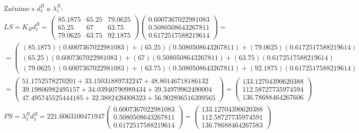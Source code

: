 \documentclass[a4paper]{article}
\begin{document}
	\begin{align*}
		&\text{Začnime s $d_1^B$ a $\lambda_1^B$:}
		\\
		&LS=K_B d_1^B= \begin{pmatrix}
			85.1875 & 65.25 & 79.0625 \\
			65.25 & 67 & 63.75 \\
			79.0625 & 63.75 & 92.1875
		\end{pmatrix}
		\begin{pmatrix}
			0.6007367022981083 \\ 
			0.5080508643267811 \\ 
			0.6172517588219614
		\end{pmatrix}=
		\\
		&=\begin{pmatrix}
			(85.1875)(0.6007367022981083) + (65.25)(0.5080508643267811) + (79.0625)(0.6172517588219614) \\
			(65.25)(0.6007367022981083) + (67)(0.5080508643267811) + (63.75)(0.6172517588219614) \\
			(79.0625)(0.6007367022981083) + (63.75)(0.5080508643267811) + (92.1875)(0.6172517588219614)
		\end{pmatrix}=
		\\
		&=\begin{pmatrix}
			51.1752578270201 + 33.15031889732247 + 48.80146718186132 \\
			39.19806982495157 + 34.03940790989434 + 39.34979962490004 \\
			47.495745525444185 + 32.3882426008323 + 56.902896516399565
		\end{pmatrix}=
		\begin{pmatrix}
			133.12704390620388 \\
			112.58727735974594 \\
			136.78688464267606
		\end{pmatrix}
		\\
		&PS=\lambda_1^B d_1^B= 221.6063100471947 \begin{pmatrix}
			0.6007367022981083 \\ 
			0.5080508643267811 \\ 
			0.6172517588219614
		\end{pmatrix} = 
		\begin{pmatrix}
			133.12704390620388 \\
			112.58727735974591 \\
			136.78688464267583
		\end{pmatrix}
		\\

\end{align*}
\end{document}
